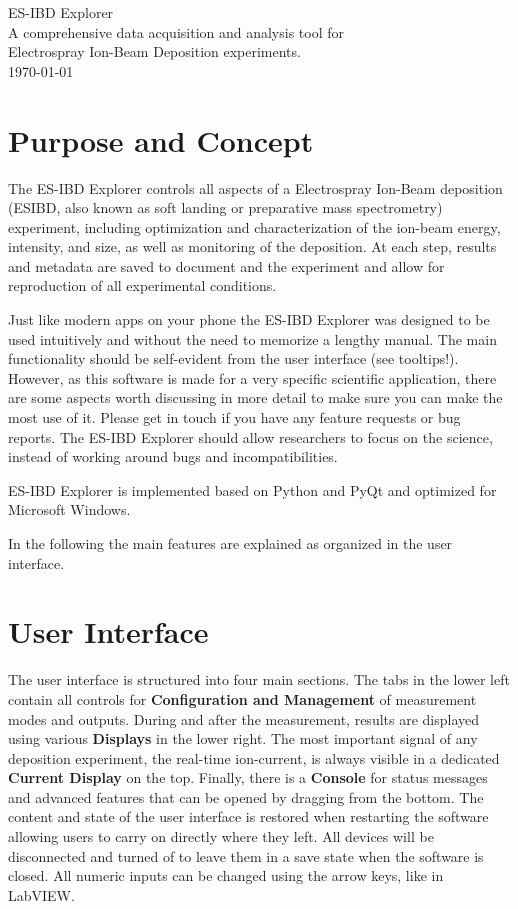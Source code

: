 \documentclass[a4paper,11pt,DIV=13]{scrartcl}
\begin{document}
\begin{centering}
{\LARGE ES-IBD Explorer}\\
\vspace{.5cm}
{\Large A comprehensive data acquisition and analysis tool for \\ Electrospray Ion-Beam Deposition experiments.} \\
\vspace{.5cm}
{\today}\\
\end{centering}

\section{Purpose and Concept}

The ES-IBD Explorer controls all aspects of a Electrospray Ion-Beam deposition (ESIBD, also known as soft landing or preparative mass spectrometry) experiment, including optimization and characterization of the ion-beam energy, intensity, and size, as well as monitoring of the deposition. At each step, results and metadata are saved to document and the experiment and allow for reproduction of all experimental conditions.

Just like modern apps on your phone the ES-IBD Explorer was designed to be used intuitively and without the need to memorize a lengthy manual. The main functionality should be self-evident from the user interface (see tooltips!). However, as this software is made for a very specific scientific application, there are some aspects worth discussing in more detail to make sure you can make the most use of it. Please get in touch if you have any feature requests or bug reports. The ES-IBD Explorer should allow researchers to focus on the science, instead of working around bugs and incompatibilities.

ES-IBD Explorer is implemented based on Python and PyQt and optimized for Microsoft Windows.

In the following the main features are explained as organized in the user interface.

\section{User Interface}
The user interface is structured into four main sections. The tabs in the lower left contain all controls for \textbf{Configuration and Management} of measurement modes and outputs. During and after the measurement, results are displayed using various \textbf{Displays} in the lower right. The most important signal of any deposition experiment, the real-time ion-current, is always visible in a dedicated \textbf{Current Display} on the top. Finally, there is a \textbf{Console} for status messages and advanced features that can be opened by dragging from the bottom. The content and state of the user interface is restored when restarting the software allowing users to carry on directly where they left. All devices will be disconnected and turned of to leave them in a save state when the software is closed. All numeric inputs can be changed using the arrow keys, like in LabVIEW.
\end{document}
